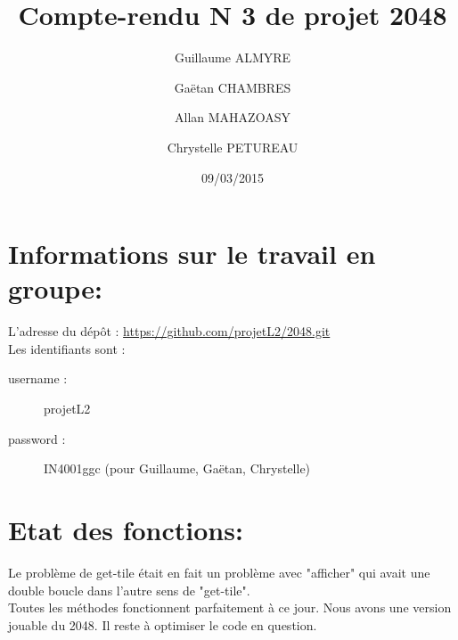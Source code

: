 \documentclass{report}
\begin{document}
\lstset{language=C}

\title{Compte-rendu N 3 de projet 2048}
\author{Guillaume ALMYRE 
\and
Ga\"{e}tan CHAMBRES
\and
Allan MAHAZOASY
\and 
Chrystelle PETUREAU}
\date{09/03/2015}

\maketitle

\section*{Informations sur le travail en groupe:}
L'adresse du d\'{e}p\^{o}t : \url{https://github.com/projetL2/2048.git} \\Les identifiants sont :
\begin{description}
\item [username : ] projetL2
\item [password : ] IN4001ggc  (pour Guillaume, Ga\"{e}tan, Chrystelle)
\end{description}

\section*{Etat des fonctions:}
\begin{description}
Le probl\`{e}me de get-tile \'{e}tait en fait un probl\`{e}me avec "afficher" qui avait une double boucle dans l'autre sens de "get-tile".\\
Toutes les m\'{e}thodes fonctionnent parfaitement \`{a} ce jour. Nous avons une version jouable du 2048. Il reste \`{a} optimiser le code en question.
\end{description}
\end{document}

